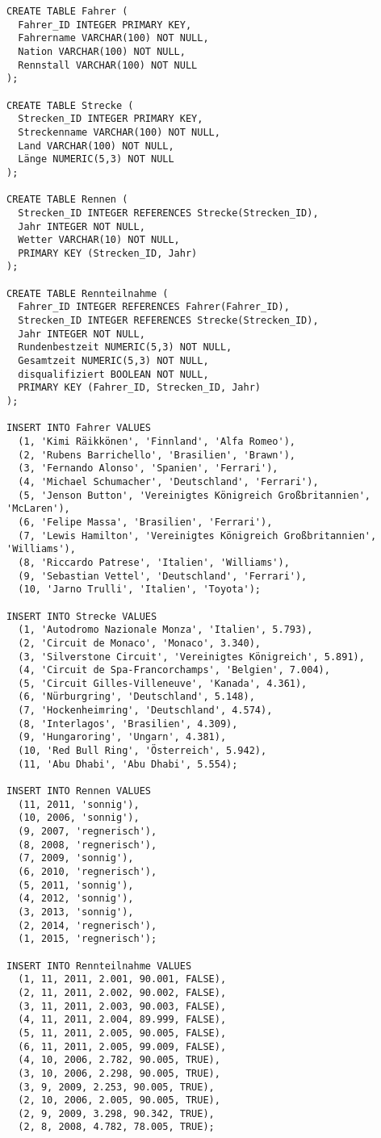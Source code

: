 \documentclass{bschlangaul-aufgabe}
\begin{document}
\begin{verbatim}
CREATE TABLE Fahrer (
  Fahrer_ID INTEGER PRIMARY KEY,
  Fahrername VARCHAR(100) NOT NULL,
  Nation VARCHAR(100) NOT NULL,
  Rennstall VARCHAR(100) NOT NULL
);

CREATE TABLE Strecke (
  Strecken_ID INTEGER PRIMARY KEY,
  Streckenname VARCHAR(100) NOT NULL,
  Land VARCHAR(100) NOT NULL,
  Länge NUMERIC(5,3) NOT NULL
);

CREATE TABLE Rennen (
  Strecken_ID INTEGER REFERENCES Strecke(Strecken_ID),
  Jahr INTEGER NOT NULL,
  Wetter VARCHAR(10) NOT NULL,
  PRIMARY KEY (Strecken_ID, Jahr)
);

CREATE TABLE Rennteilnahme (
  Fahrer_ID INTEGER REFERENCES Fahrer(Fahrer_ID),
  Strecken_ID INTEGER REFERENCES Strecke(Strecken_ID),
  Jahr INTEGER NOT NULL,
  Rundenbestzeit NUMERIC(5,3) NOT NULL,
  Gesamtzeit NUMERIC(5,3) NOT NULL,
  disqualifiziert BOOLEAN NOT NULL,
  PRIMARY KEY (Fahrer_ID, Strecken_ID, Jahr)
);

INSERT INTO Fahrer VALUES
  (1, 'Kimi Räikkönen', 'Finnland', 'Alfa Romeo'),
  (2, 'Rubens Barrichello', 'Brasilien', 'Brawn'),
  (3, 'Fernando Alonso', 'Spanien', 'Ferrari'),
  (4, 'Michael Schumacher', 'Deutschland', 'Ferrari'),
  (5, 'Jenson Button', 'Vereinigtes Königreich Großbritannien', 'McLaren'),
  (6, 'Felipe Massa', 'Brasilien', 'Ferrari'),
  (7, 'Lewis Hamilton', 'Vereinigtes Königreich Großbritannien', 'Williams'),
  (8, 'Riccardo Patrese', 'Italien', 'Williams'),
  (9, 'Sebastian Vettel', 'Deutschland', 'Ferrari'),
  (10, 'Jarno Trulli', 'Italien', 'Toyota');

INSERT INTO Strecke VALUES
  (1, 'Autodromo Nazionale Monza', 'Italien', 5.793),
  (2, 'Circuit de Monaco', 'Monaco', 3.340),
  (3, 'Silverstone Circuit', 'Vereinigtes Königreich', 5.891),
  (4, 'Circuit de Spa-Francorchamps', 'Belgien', 7.004),
  (5, 'Circuit Gilles-Villeneuve', 'Kanada', 4.361),
  (6, 'Nürburgring', 'Deutschland', 5.148),
  (7, 'Hockenheimring', 'Deutschland', 4.574),
  (8, 'Interlagos', 'Brasilien', 4.309),
  (9, 'Hungaroring', 'Ungarn', 4.381),
  (10, 'Red Bull Ring', 'Österreich', 5.942),
  (11, 'Abu Dhabi', 'Abu Dhabi', 5.554);

INSERT INTO Rennen VALUES
  (11, 2011, 'sonnig'),
  (10, 2006, 'sonnig'),
  (9, 2007, 'regnerisch'),
  (8, 2008, 'regnerisch'),
  (7, 2009, 'sonnig'),
  (6, 2010, 'regnerisch'),
  (5, 2011, 'sonnig'),
  (4, 2012, 'sonnig'),
  (3, 2013, 'sonnig'),
  (2, 2014, 'regnerisch'),
  (1, 2015, 'regnerisch');

INSERT INTO Rennteilnahme VALUES
  (1, 11, 2011, 2.001, 90.001, FALSE),
  (2, 11, 2011, 2.002, 90.002, FALSE),
  (3, 11, 2011, 2.003, 90.003, FALSE),
  (4, 11, 2011, 2.004, 89.999, FALSE),
  (5, 11, 2011, 2.005, 90.005, FALSE),
  (6, 11, 2011, 2.005, 99.009, FALSE),
  (4, 10, 2006, 2.782, 90.005, TRUE),
  (3, 10, 2006, 2.298, 90.005, TRUE),
  (3, 9, 2009, 2.253, 90.005, TRUE),
  (2, 10, 2006, 2.005, 90.005, TRUE),
  (2, 9, 2009, 3.298, 90.342, TRUE),
  (2, 8, 2008, 4.782, 78.005, TRUE);

\end{verbatim}
\end{document}
